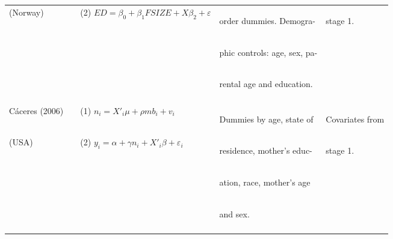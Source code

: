 \documentclass{article}[11pt,subeqn]
\begin{document}
\begin{spacing}{1.5}
\begin{center}
\begin{rotate}{90}
\begin{tabular}{lp{4mm}lll}
\\
(Norway) & &
(2) $ED=\beta_0+\beta_1 FSIZE + X\beta_2 + \varepsilon$ &
\begin{small}order dummies. Demogra-\end{small}  &
\begin{small}stage 1.\end{small}
\\
& & &
\begin{small}phic controls: age, sex, pa-\end{small}&
\\
& & &
\begin{small}rental age and education.\end{small}&
\\
\begin{footnotesize}\end{footnotesize}&\begin{footnotesize}\end{footnotesize}&\begin{footnotesize}\end{footnotesize}&\begin{footnotesize}\end{footnotesize}&\begin{footnotesize}\end{footnotesize}\\
C\'aceres (2006) & &
(1) $n_i=X'_i\mu + \rho mb_i + v_i$ &
\begin{small}Dummies by age, state of\end{small}&
\begin{small}Covariates from\end{small}
\\
(USA) & &
(2) $y_i=\alpha + \gamma n_i + X'_i\beta + \varepsilon_i$ &
\begin{small}residence, mother's educ- \end{small}&
\begin{small}stage 1.\end{small}
\\
& & &
\begin{small}ation, race, mother's age\end{small}&
\\
& & &
\begin{small}and sex.\end{small}&
\\
\begin{footnotesize}\end{footnotesize}&\begin{footnotesize}\end{footnotesize}&\begin{footnotesize}\end{footnotesize}&\begin{footnotesize}\end{footnotesize}&\begin{footnotesize}\end{footnotesize}\\

\end{tabular}
\end{rotate}
\end{center}
\end{spacing}
\end{document}
